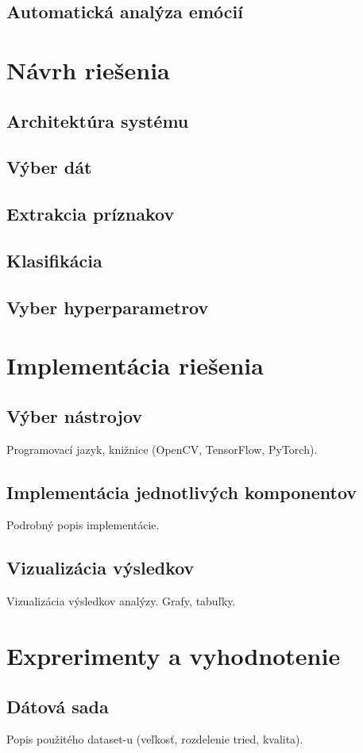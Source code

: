 \subsection{Automatická analýza emócií}

\section{Návrh riešenia}
\subsection{Architektúra systému}
\subsection{Výber dát}
\subsection{Extrakcia príznakov}
\subsection{Klasifikácia}
\subsection{Vyber hyperparametrov}

\section{Implementácia riešenia}
\subsection{Výber nástrojov}Programovací jazyk, knižnice (OpenCV, TensorFlow, PyTorch).
\subsection{Implementácia jednotlivých komponentov}Podrobný popis implementácie.
\subsection{Vizualizácia výsledkov}Vizualizácia výsledkov analýzy. Grafy, tabuľky.

\section{Exprerimenty a vyhodnotenie}
\subsection{Dátová sada} Popis použitého dataset-u (veľkosť, rozdelenie tried, kvalita).
